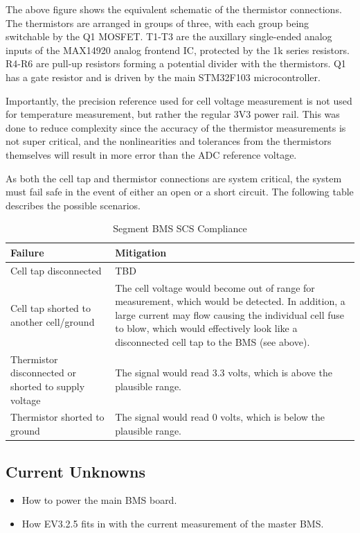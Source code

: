 \documentclass[12pt]{article}
\begin{document}
The above figure shows the equivalent schematic of the thermistor connections.
The thermistors are arranged in groups of three, with each group being switchable by the Q1 MOSFET.
T1-T3 are the auxillary single-ended analog inputs of the MAX14920 analog frontend IC, protected by the 1k series resistors.
R4-R6 are pull-up resistors forming a potential divider with the thermistors.
Q1 has a gate resistor and is driven by the main STM32F103 microcontroller.

Importantly, the precision reference used for cell voltage measurement is not used for temperature measurement, but rather the regular 3V3 power rail.
This was done to reduce complexity since the accuracy of the thermistor measurements is not super critical, and the nonlinearities and tolerances from the thermistors themselves will result in more error than the ADC reference voltage.

As both the cell tap and thermistor connections are system critical, the system must fail safe in the event of either an open or a short circuit.
The following table describes the possible scenarios.

\begin{table}[H]
  \centering
  \begin{tabular}{|p{0.3\linewidth}|p{0.7\linewidth}|}
    \hline
    \textbf{Failure} & \textbf{Mitigation} \\
    \hline
    Cell tap disconnected & TBD \\
    \hline
    Cell tap shorted to another cell/ground & The cell voltage would become out of range for measurement, which would be detected.
                                              In addition, a large current may flow causing the individual cell fuse to blow, which would effectively look like a disconnected cell tap to the BMS (see above). \\
    \hline
    Thermistor disconnected or shorted to supply voltage & The signal would read 3.3 volts, which is above the plausible range. \\
    \hline
    Thermistor shorted to ground & The signal would read 0 volts, which is below the plausible range. \\
    \hline
  \end{tabular}
  \caption{Segment BMS SCS Compliance}
  \label{tbl:segment-bms-scs-compliance}
\end{table}

\subsection{Current Unknowns}
\begin{itemize}
\item How to power the main BMS board.
\item How EV3.2.5 fits in with the current measurement of the master BMS.
\end{itemize}

\begin{versionhistory}
\end{versionhistory}
\end{document}
